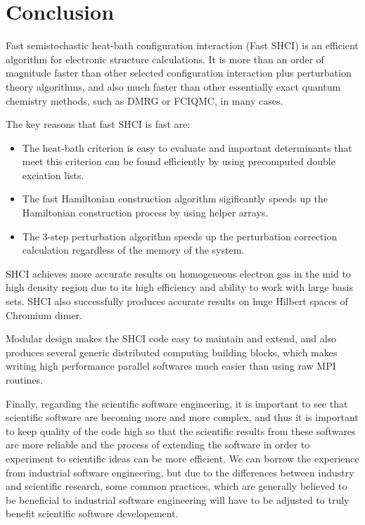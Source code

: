 \documentclass[phd,tocprelim]{cornell}
\begin{document}






\chapter{Conclusion}

Fast semistochastic heat-bath configuration interaction (Fast SHCI) is an efficient algorithm for electronic structure calculations.
It is more than an order of magnitude faster than other selected configuration interaction plus perturbation theory algorithms, and also much faster than other essentially exact quantum chemistry methods, such as DMRG or FCIQMC, in many cases.

The key reasons that fast SHCI is fast are:
\begin{itemize}
    \item The heat-bath criterion is easy to evaluate and important determinants that meet this criterion can be found efficiently by using precomputed double exciation lists.
    \item The fast Hamiltonian construction algorithm sigificantly speeds up the Hamiltonian construction process by using helper arrays.
    \item The 3-step perturbation algorithm speeds up the perturbation correction calculation regardless of the memory of the system.
\end{itemize}

SHCI achieves more accurate results on homogeneous electron gas in the mid to high density region due to its high efficiency and ability to work with large basis sets.
SHCI also successfully produces accurate results on huge Hilbert spaces of Chromium dimer.

Modular design makes the SHCI code easy to maintain and extend, and also produces several generic distributed computing building blocks, which makes writing high performance parallel softwares much easier than using raw MPI routines.

Finally, regarding the scientific software engineering, it is important to see that scientific software are becoming more and more complex, and thus it is important to keep quality of the code high so that the scientific results from these softwares are more reliable and the process of extending the software in order to experiment to scientific ideas can be more efficient.
We can borrow the experience from industrial software engineering, but due to the differences between industry and scientific research, some common practices, which are generally believed to be beneficial to industrial software engineering will have to be adjusted to truly benefit scientific software developement.


\end{document}
